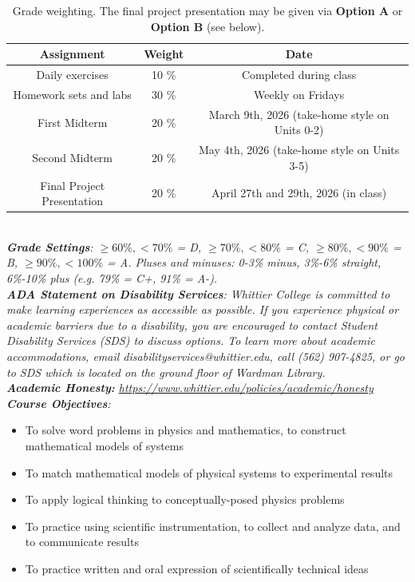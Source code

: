 \documentclass[10pt]{article}
\begin{document}
\begin{table}
\centering
\begin{tabular}{| c | c | c |}
\hline
\textbf{Assignment} & \textbf{Weight} & \textbf{Date} \\ \hline
Daily exercises & 10 \% & Completed during class\\ \hline
Homework sets and labs & 30 \% & Weekly on Fridays \\ \hline
First Midterm & 20 \% & March 9th, 2026 (take-home style on Units 0-2)\\ \hline
Second Midterm & 20 \% & May 4th, 2026 (take-home style on Units 3-5) \\ \hline
Final Project Presentation & 20 \% & April 27th and 29th, 2026 (in class) \\ \hline
\end{tabular}
\caption{\label{tab:grades} Grade weighting. The final project presentation may be given via \textbf{Option A} or \textbf{Option B} (see below).}
\end{table} \\
\noindent
\textit{\textbf{Grade Settings}: $\geq 60\%, <70\%$ = D, $\geq 70\%, <80\%$ = C, $\geq 80\%, <90\%$ = B, $\geq 90\%, <100\%$ = A. Pluses and minuses: 0-3\% minus, 3\%-6\% straight, 6\%-10\% plus (e.g. 79\% = C+, 91\% = A-).} \\
\textit{\textbf{ADA Statement on Disability Services}: Whittier College is committed to make learning experiences as accessible as possible. If you experience physical or academic barriers due to a disability, you are encouraged to contact Student Disability Services (SDS) to discuss options. To learn more about academic accommodations, email disabilityservices@whittier.edu, call (562) 907-4825, or go to SDS which is located on the ground floor of Wardman Library.} \\
\textit{\textbf{Academic Honesty:} \url{https://www.whittier.edu/policies/academic/honesty}} \\
\noindent
\textit{\textbf{Course Objectives}:}
\begin{itemize}
\item To solve word problems in physics and mathematics, to construct mathematical models of systems
\item To match mathematical models of physical systems to experimental results
\item To apply logical thinking to conceptually-posed physics problems
\item To practice using scientific instrumentation, to collect and analyze data, and to communicate results
\item To practice written and oral expression of scientifically technical ideas
\end{itemize}
\end{document}
